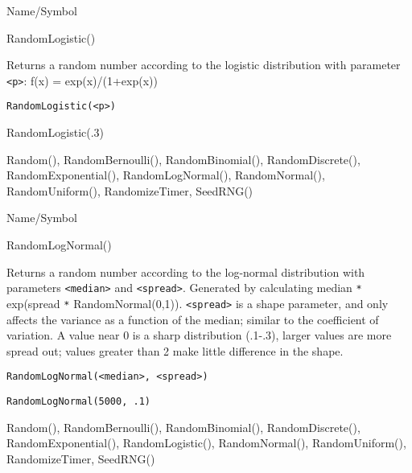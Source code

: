 \begin{desc}{Name/Symbol}
\item[Name/Symbol]	RandomLogistic()  

\item[Description]	Returns a random number according to the logistic distribution 
		with parameter \verb+<p>+: f(x) = exp(x)/(1+exp(x))

\item[Usage]		
\begin{verbatim}
RandomLogistic(<p>)
\end{verbatim}

\item[Example]	RandomLogistic(.3)

\item[See Also]	Random(), RandomBernoulli(), RandomBinomial(), 
		RandomDiscrete(), RandomExponential(), RandomLogNormal(), 
		RandomNormal(), RandomUniform(), RandomizeTimer, SeedRNG()
\end{desc}

\rl


\begin{desc}{Name/Symbol}
\item[Name/Symbol] 	RandomLogNormal()

\item[Description]  	Returns a random number according to the log-normal 
		distribution with parameters \verb+<median>+ and \verb+<spread>+. Generated 
		by calculating median \verb!*! exp(spread \verb!*! RandomNormal(0,1)). 
		\verb+<spread>+ is a shape parameter, and only affects the variance 
		as a function of the median; similar to the coefficient of 
		variation.  A value near 0 is a sharp distribution (.1-.3), 
		larger values are more spread out; values greater than 2 make 
		little difference in the shape.

\item[Usage]
\begin{verbatim}
RandomLogNormal(<median>, <spread>)
\end{verbatim}

\item[Example]      	
\begin{verbatim}
RandomLogNormal(5000, .1)
\end{verbatim}

\item[See Also]	Random(), RandomBernoulli(), RandomBinomial(), 
		RandomDiscrete(), RandomExponential(), RandomLogistic(),
		RandomNormal(), RandomUniform(), RandomizeTimer, SeedRNG()
\end{desc}

